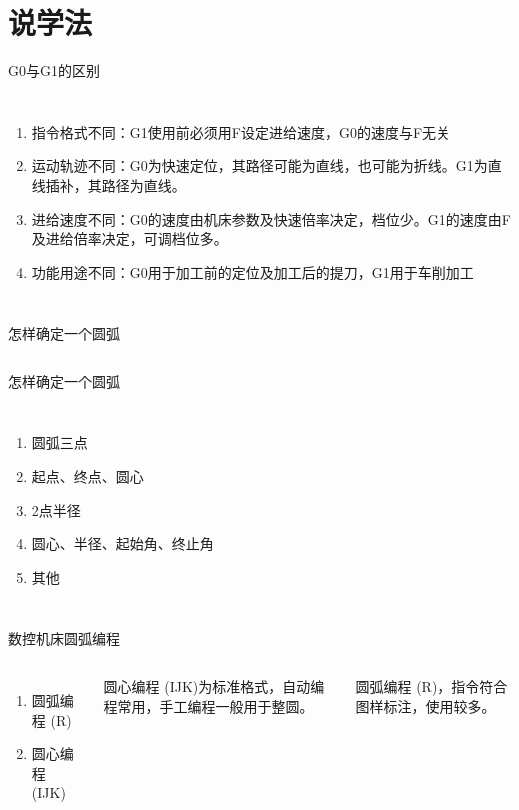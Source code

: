 \documentclass[UTF8,zihao=-4,handout,smaller,aspectratio=1610]{ctexbeamer}
\begin{document}
\section{说学法}
\begin{frame}{G0与G1的区别}
    \begin{columns}[onlytextwidth]
        \column{\textwidth}
\begin{enumerate}
    \item 指令格式不同：G1使用前必须用F设定进给速度，G0的速度与F无关 
    \item 运动轨迹不同：G0为快速定位，其路径可能为直线，也可能为折线。G1为直线插补，其路径为直线。
    \item 进给速度不同：G0的速度由机床参数及快速倍率决定，档位少。G1的速度由F及进给倍率决定，可调档位多。
    \item 功能用途不同：G0用于加工前的定位及加工后的提刀，G1用于车削加工
\end{enumerate}
    \end{columns}
\end{frame}


\begin{frame}{怎样确定一个圆弧}
    \begin{columns}
        \column{\textwidth}
    \end{columns}
\end{frame}

\begin{frame}{怎样确定一个圆弧}
    \begin{columns}
        \column{\textwidth}
        \begin{enumerate}
            \item 圆弧三点
            \item 起点、终点、圆心
            \item 2点半径
            \item 圆心、半径、起始角、终止角
            \item 其他
        \end{enumerate}
    \end{columns}
\end{frame}

\begin{frame}{数控机床圆弧编程}
    \begin{columns}
        \begin{enumerate}
            \item 圆弧编程 (R)
            \item 圆心编程 (IJK)
        \end{enumerate}
         \vspace{1cm}
         圆心编程 (IJK)为标准格式，自动编程常用，手工编程一般用于整圆。
         
         圆弧编程 (R)，指令符合图样标注，使用较多。
    \end{columns}
\end{frame}
\end{document}
